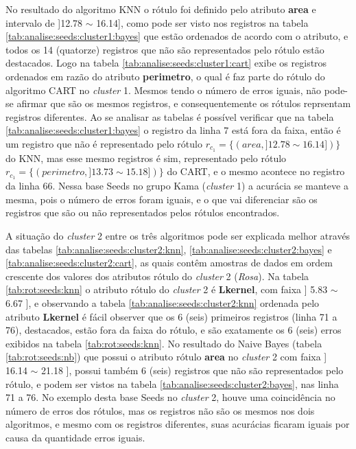 \begin{table}[!ht]
    
 \label{tab:analise:seeds:cluster1}
\end{table}


No resultado do algoritmo KNN o rótulo foi definido pelo atributo \textbf{area} e intervalo de ]12.78 $\sim$ 16.14], como pode ser visto nos registros na tabela \ref{tab:analise:seeds:cluster1:bayes} que estão ordenados de acordo com o atributo, e todos os 14 (quatorze) registros que não são representados pelo rótulo estão destacados. Logo na tabela \ref{tab:analise:seeds:cluster1:cart} exibe os registros ordenados em razão do atributo \textbf{perimetro}, o qual é faz parte do rótulo do algoritmo CART no \textit{cluster} 1. Mesmos tendo o número de erros iguais, não pode-se afirmar que são os mesmos registros, e consequentemente os rótulos reprsentam registros diferentes. Ao se analisar as tabelas é possível verificar que na tabela \ref{tab:analise:seeds:cluster1:bayes} o registro da linha 7 está fora da faixa, então é um registro que não é representado pelo rótulo ${r_{c_1}=\{ (area, ]12.78 \sim 16.14]) \} }$ do KNN, mas esse mesmo registros é sim, representado pelo rótulo ${r_{c_1}=\{ (perimetro, ]13.73 \sim 15.18]) \} }$ do CART, e o mesmo acontece no registro da linha 66. 
Nessa base Seeds no grupo Kama (\textit{cluster} 1) a acurácia se manteve a mesma, pois o número de erros foram iguais, e o que vai diferenciar são os registros que são ou não representados pelos rótulos encontrados.
\newpage

A situação do \textit{cluster} 2 entre os três algoritmos pode ser explicada melhor através das tabelas \ref{tab:analise:seeds:cluster2:knn}, \ref{tab:analise:seeds:cluster2:bayes} e \ref{tab:analise:seeds:cluster2:cart}, as quais contêm amostras de dados em ordem crescente dos valores dos atributos rótulo  do \textit{cluster} 2 (\textit{Rosa}). Na tabela \ref{tab:rot:seeds:knn} o atributo rótulo do \textit{cluster} 2 é \textbf{Lkernel}, com faixa ] 5.83 $\sim$ 6.67 ], e observando a tabela \ref{tab:analise:seeds:cluster2:knn} ordenada pelo atributo \textbf{Lkernel} é fácil observer que os 6 (seis) primeiros registros (linha 71 a 76), destacados, estão fora da faixa do rótulo, e são exatamente os 6 (seis) erros exibidos na tabela \ref{tab:rot:seeds:knn}.
No resultado do Naive Bayes (tabela \ref{tab:rot:seeds:nb}) que possui o atributo rótulo \textbf{area} no \textit{cluster} 2 com faixa ] 16.14 $\sim$  21.18 ], possui também 6 (seis) registros que não são representados pelo rótulo, e podem ser vistos na tabela \ref{tab:analise:seeds:cluster2:bayes}, nas linha 71 a 76. No exemplo desta base Seeds no \textit{cluster} 2, houve uma coincidência no número de erros dos rótulos, mas os registros não são os mesmos nos dois algoritmos, e mesmo com os registros diferentes, suas acurácias ficaram iguais por causa da quantidade erros iguais.

